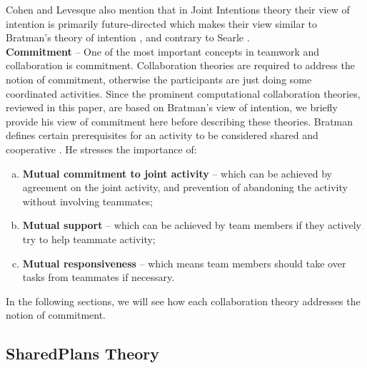 \documentclass[12pt]{report}
\begin{document}

Cohen and Levesque also mention that in Joint Intentions theory their view of
intention is primarily future-directed \cite{cohen:intention-commitment} which
makes their view similar to Bratman's theory of intention
\cite{bratman:intention}, and contrary to Searle \cite{searle:collective}.\\

\textbf{Commitment} -- One of the most important concepts in teamwork and
collaboration is commitment. Collaboration theories are required to address the
notion of commitment, otherwise the participants are just doing some coordinated
activities. Since the prominent computational collaboration theories, reviewed
in this paper, are based on Bratman's view of intention, we briefly provide his
view of commitment here before describing these theories. Bratman defines
certain prerequisites for an activity to be considered shared and cooperative
\cite{bratman:shared-activity}. He stresses the importance of:

\begin{enumerate}[a)]
  \item \textbf{Mutual commitment to joint activity} -- which can be achieved by
  agreement on the joint activity, and prevention of abandoning the activity
  without involving teammates;
  \item \textbf{Mutual support} -- which can be achieved by team members
  if they actively try to help teammate activity;
  \item \textbf{Mutual responsiveness} -- which means team members should take
  over tasks from teammates if necessary.
\end{enumerate}

In the following sections, we will see how each collaboration theory addresses
the notion of commitment.

\subsection{SharedPlans Theory}
\label{sec:sharedplans}
\end{document}
